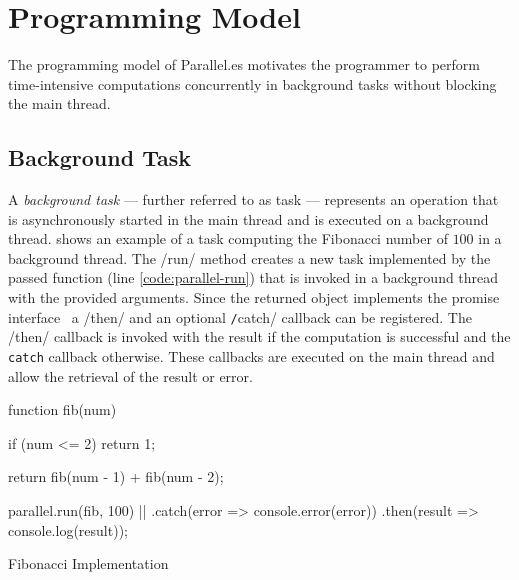 \section{Programming Model}\label{sec:programming-model}
The programming model of Parallel.es motivates the programmer to perform time-intensive computations concurrently in background tasks without blocking the main thread. 

\subsection{Background Task}
A \textit{background task} --- further referred to as task --- represents an operation that is asynchronously started in the main thread and is executed on a background thread.  shows an example of a task computing the Fibonacci number of $100$ in a background thread. The \javascriptinline/run/ method creates a new task implemented by the passed function (line \ref{code:parallel-run}) that is invoked in a background thread with the provided arguments. Since the returned object implements the promise interface~\cite[Section 18.3.18]{ecmaScript2015} a \javascriptinline/then/ and an optional \texttt/catch/ callback can be registered. The \javascriptinline/then/ callback is invoked with the result if the computation is successful and the \texttt{catch} callback otherwise. These callbacks are executed on the main thread and allow the retrieval of the result or error. 


\begin{listing}
	\begin{javascriptcode}
function fib(num) {
	if (num <= 2) {
    	return 1;
	}

	return fib(num - 1) + fib(num - 2);
}
        
parallel.run(fib, 100) |$\label{code:parallel-run}$|
	.catch(error => console.error(error))
	.then(result => console.log(result));	
	\end{javascriptcode}

	\caption{Fibonacci Implementation}
	\label{fig:fibonacci-implementation}
\end{listing}

